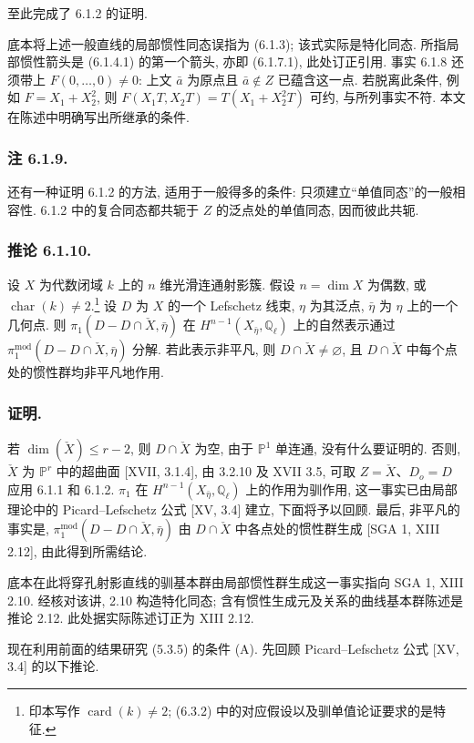 至此完成了 6.1.2 的证明.

\begin{editorialnote}
底本将上述一般直线的局部惯性同态误指为 (6.1.3); 该式实际是特化同态. 所指局部惯性箭头是 (6.1.4.1) 的第一个箭头, 亦即 (6.1.7.1), 此处订正引用. 事实 6.1.8 还须带上 $F(0,\ldots,0)\ne0$: 上文 $\bar a$ 为原点且 $\bar a\notin Z$ 已蕴含这一点. 若脱离此条件, 例如 $F=X_1+X_2^2$, 则 $F(X_1T,X_2T)=T(X_1+X_2^2T)$ 可约, 与所列事实不符. 本文在陈述中明确写出所继承的条件.
\end{editorialnote}

\subsubsection*{注 6.1.9.}
还有一种证明 6.1.2 的方法, 适用于一般得多的条件: 只须建立“单值同态”的一般相容性. 6.1.2 中的复合同态都共轭于 $Z$ 的泛点处的单值同态, 因而彼此共轭.

\subsubsection*{推论 6.1.10.}
设 $X$ 为代数闭域 $k$ 上的 $n$ 维光滑连通射影簇. 假设 $n=\dim X$ 为偶数, 或 $\operatorname{char}(k)\ne2$.\footnote{印本写作 $\operatorname{card}(k)\ne2$; (6.3.2) 中的对应假设以及驯单值论证要求的是特征.}
设 $D$ 为 $X$ 的一个 Lefschetz 线束, $\eta$ 为其泛点, $\bar\eta$ 为 $\eta$ 上的一个几何点. 则 $\pi_1(D-D\cap\check X,\bar\eta)$ 在 $H^{n-1}(X_{\bar\eta},\mathbb Q_\ell)$ 上的自然表示通过 $\pi_1^{\mathrm{mod}}(D-D\cap\check X,\bar\eta)$ 分解. 若此表示非平凡, 则 $D\cap\check X\ne\varnothing$, 且 $D\cap\check X$ 中每个点处的惯性群均非平凡地作用.

\subsubsection*{证明.}
若 $\dim(\check X)\le r-2$, 则 $D\cap\check X$ 为空, 由于 $\mathbb P^1$ 单连通, 没有什么要证明的. 否则, $\check X$ 为 $\mathbb P^r$ 中的超曲面 [XVII, 3.1.4], 由 3.2.10 及 XVII 3.5, 可取 $Z=\check X$、$D_o=D$ 应用 6.1.1 和 6.1.2. $\pi_1$ 在 $H^{n-1}(X_{\bar\eta},\mathbb Q_\ell)$ 上的作用为驯作用, 这一事实已由局部理论中的 Picard--Lefschetz 公式 [XV, 3.4] 建立, 下面将予以回顾. 最后, 非平凡的事实是, $\pi_1^{\mathrm{mod}}(D-D\cap\check X,\bar\eta)$ 由 $D\cap\check X$ 中各点处的惯性群生成 [SGA 1, XIII 2.12], 由此得到所需结论.

\begin{editorialnote}
底本在此将穿孔射影直线的驯基本群由局部惯性群生成这一事实指向 SGA 1, XIII 2.10. 经核对该讲, 2.10 构造特化同态; 含有惯性生成元及关系的曲线基本群陈述是推论 2.12. 此处据实际陈述订正为 XIII 2.12.
\end{editorialnote}

现在利用前面的结果研究 (5.3.5) 的条件 (A). 先回顾 Picard--Lefschetz 公式 [XV, 3.4] 的以下推论.
